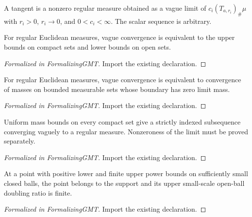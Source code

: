 \begin{definition}
\label{def:tangent-api}
\leanok
{}
A tangent is a nonzero regular measure obtained as a vague limit of $c_i(T_{a,r_i})_\#\mu$ with $r_i>0$, $r_i\to0$, and $0<c_i<\infty$. The scalar sequence is arbitrary.
\end{definition}

\begin{theorem}
\label{gmt:portmanteau}
\leanok
{}
For regular Euclidean measures, vague convergence is equivalent to the upper bounds on compact sets and lower bounds on open sets.
\end{theorem}
\begin{proof}[Formalized in FormalizingGMT]
\leanok
Import the existing declaration.
\end{proof}

\begin{theorem}
\label{gmt:continuity-sets}
\leanok
{}
For regular Euclidean measures, vague convergence is equivalent to convergence of masses on bounded measurable sets whose boundary has zero limit mass.
\end{theorem}
\begin{proof}[Formalized in FormalizingGMT]
\leanok
{}
Import the existing declaration.
\end{proof}

\begin{theorem}
\label{thm:compactness}
\leanok
{}
Uniform mass bounds on every compact set give a strictly indexed subsequence converging vaguely to a regular measure. Nonzeroness of the limit must be proved separately.
\end{theorem}
\begin{proof}[Formalized in FormalizingGMT]
\leanok
Import the existing declaration.
\end{proof}

\begin{lemma}
\label{gmt:doubling-bounds}
\leanok
{}
At a point with positive lower and finite upper power bounds on sufficiently small closed balls, the point belongs to the support and its upper small-scale open-ball doubling ratio is finite.
\end{lemma}
\begin{proof}[Formalized in FormalizingGMT]
\leanok
Import the existing declaration.
\end{proof}

